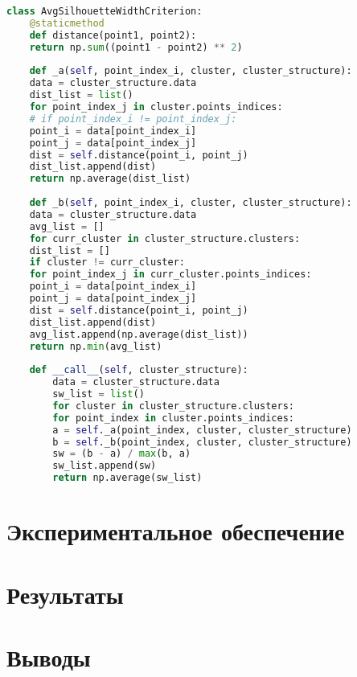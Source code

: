 \documentclass[12pt,twoside,a4paper,tikz,border=5]{refart}
\begin{document}
		
		\begin{lstlisting}[language=Python, caption=Python example]
    class AvgSilhouetteWidthCriterion:
    @staticmethod
    def distance(point1, point2):
    return np.sum((point1 - point2) ** 2)
    
    def _a(self, point_index_i, cluster, cluster_structure):
    data = cluster_structure.data
    dist_list = list()
    for point_index_j in cluster.points_indices:
    # if point_index_i != point_index_j:
    point_i = data[point_index_i]
    point_j = data[point_index_j]
    dist = self.distance(point_i, point_j)
    dist_list.append(dist)
    return np.average(dist_list)
    
    def _b(self, point_index_i, cluster, cluster_structure):
    data = cluster_structure.data
    avg_list = []
    for curr_cluster in cluster_structure.clusters:
    dist_list = []
    if cluster != curr_cluster:
    for point_index_j in curr_cluster.points_indices:
    point_i = data[point_index_i]
    point_j = data[point_index_j]
    dist = self.distance(point_i, point_j)
    dist_list.append(dist)
    avg_list.append(np.average(dist_list))
    return np.min(avg_list)
    
    def __call__(self, cluster_structure):
	    data = cluster_structure.data
	    sw_list = list()
	    for cluster in cluster_structure.clusters:
	    for point_index in cluster.points_indices:
	    a = self._a(point_index, cluster, cluster_structure)
	    b = self._b(point_index, cluster, cluster_structure)
	    sw = (b - a) / max(b, a)
	    sw_list.append(sw)
	    return np.average(sw_list)
		\end{lstlisting}
		
		
	\section{Экспериментальное обеспечение}
	
	\section{Результаты}
	\section{Выводы}
	
	\newpage
	
	
	
\end{document}
